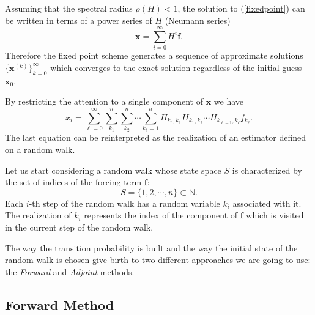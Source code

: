 \documentclass[a4paper,10pt]{article}
\begin{document}
Assuming that the spectral radius $\rho(H)<1$, the solution to
(\ref{fixedpoint}) can be written in terms of a power series of
$H$ (Neumann series)
\[
\mathbf{x}=\sum_{i=0}^\infty H^i\mathbf{f}.
\]
Therefore the fixed point scheme generates a sequence of approximate solutions
$\{\mathbf{x}^{(k)}\}_{k=0}^{\infty}$ which converges to the exact solution
regardless of the initial guess $\mathbf{x}_0$.

By restricting the attention to a single component of $\mathbf{x}$ we
have
\begin{equation}
x_i=\sum_{\ell=0}^\infty \sum_{k_1}^n\sum_{k_2}^n\cdots \sum_{k_{\ell}=1}^n
H_{k_0,k_1}H_{k_1,k_2}\cdots H_{k_{\ell-1}, k_{\ell}}f_{k_{\ell}}.
\label{forward}
\end{equation}
The last equation can be reinterpreted as the realization of an estimator
defined on a random walk.

Let us start considering a random walk whose
state space $S$ is characterized by the set of indices of the forcing term
$\mathbf{f}$:
\[
S=\{1,2,\cdots, n\} \subset \mathbb{N}.
\]
Each $i$-th step of the random walk has a random variable
$k_i$ associated with it. The realization of $k_i$ represents the index of the
component of $\mathbf{f}$
which is visited in the current step of the random walk.

The way the transition probability is built and the way the initial state of
the random walk is chosen give birth to two different approaches we are
going to use: the \textit{Forward} and \textit{Adjoint} methods.

\subsection{Forward Method}
\end{document}
